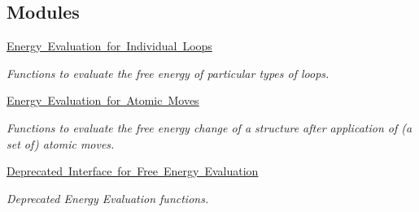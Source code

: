 \subsection*{Modules}
\begin{DoxyCompactItemize}
\item 
\mbox{\hyperlink{group__eval__loops}{Energy Evaluation for Individual Loops}}
\begin{DoxyCompactList}\small\item\em Functions to evaluate the free energy of particular types of loops. \end{DoxyCompactList}\item 
\mbox{\hyperlink{group__eval__move}{Energy Evaluation for Atomic Moves}}
\begin{DoxyCompactList}\small\item\em Functions to evaluate the free energy change of a structure after application of (a set of) atomic moves. \end{DoxyCompactList}\item 
\mbox{\hyperlink{group__eval__deprecated}{Deprecated Interface for Free Energy Evaluation}}
\begin{DoxyCompactList}\small\item\em Deprecated Energy Evaluation functions. \end{DoxyCompactList}\end{DoxyCompactItemize}
